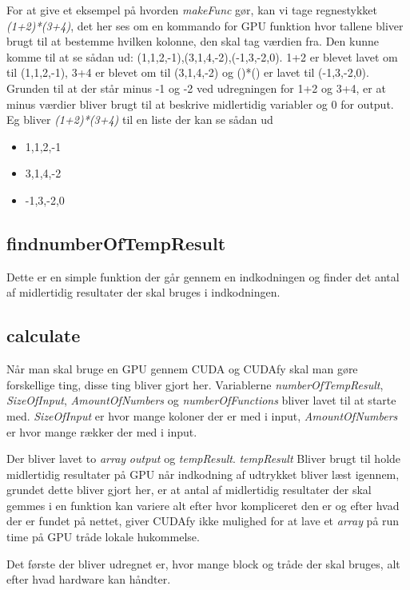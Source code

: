 For at give et eksempel på hvorden \textit{makeFunc} gør, kan vi tage regnestykket \textit{(1+2)*(3+4)}, det her ses om en kommando for GPU funktion hvor tallene bliver brugt til at bestemme hvilken kolonne, den skal tag værdien fra. Den kunne komme til at se sådan ud: (1,1,2,-1),(3,1,4,-2),(-1,3,-2,0). 1+2 er blevet lavet om til (1,1,2,-1), 3+4 er blevet om til (3,1,4,-2) og ()*() er lavet til (-1,3,-2,0). Grunden til at der står minus -1 og -2 ved udregningen for 1+2 og 3+4, er at minus værdier bliver brugt til at beskrive midlertidig variabler og 0 for output. Eg bliver \textit{(1+2)*(3+4)} til en liste der kan se sådan ud
\begin{itemize}
 \item 1,1,2,-1
 \item 3,1,4,-2
 \item -1,3,-2,0
\end{itemize}


\subsection{findnumberOfTempResult}
Dette er en simple funktion der går gennem en indkodningen og finder det antal af midlertidig resultater der skal bruges i indkodningen.

\subsection{calculate}
Når man skal bruge en GPU gennem CUDA og CUDAfy skal man gøre forskellige ting, disse ting bliver gjort her. Variablerne \textit{numberOfTempResult}, \textit{SizeOfInput},  \textit{AmountOfNumbers} og \textit{numberOfFunctions} bliver lavet til at starte med. \textit{SizeOfInput} er hvor mange koloner der er med i input, \textit{AmountOfNumbers} er hvor mange rækker der med i input.

Der bliver lavet to \textit{array} \textit{output} og \textit{tempResult}. \textit{tempResult} Bliver brugt til holde midlertidig resultater på GPU når indkodning af udtrykket bliver læst igennem, grundet dette bliver gjort her, er at antal af midlertidig resultater der skal gemmes i en funktion kan variere alt efter hvor kompliceret den er og efter hvad der er fundet på nettet, giver CUDAfy ikke mulighed for at lave et \textit{array} på run time på GPU tråde lokale hukommelse.

Det første der bliver udregnet er, hvor mange block og tråde der skal bruges, alt efter hvad hardware kan håndter.

